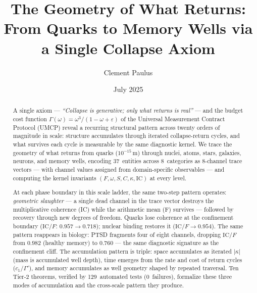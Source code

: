 \documentclass[
  aps,
  prd,
  twocolumn,
  superscriptaddress,
  nofootinbib,
  floatfix
]{revtex4-2}
\newcommand{\Gam}{\Gamma}
\newcommand{\eps}{\varepsilon}
\newcommand{\IC}{\mathrm{IC}}
\begin{document}
\title{The Geometry of What Returns:\texorpdfstring{\\}{: }
From Quarks to Memory Wells via a Single Collapse Axiom}

\author{Clement Paulus}

\date{July 2025}

\begin{abstract}
A single axiom --- \emph{``Collapse is generative; only what
returns is real''} --- and the budget cost function
$\Gam(\omega) = \omega^3/(1 - \omega + \eps)$ of the Universal
Measurement Contract Protocol (UMCP) reveal a recurring
structural pattern across twenty orders of magnitude in scale:
structure accumulates through iterated collapse-return cycles,
and what survives each cycle is measurable by the same
diagnostic kernel.  We trace the geometry of what returns
from quarks ($10^{-15}$\,m) through nuclei, atoms, stars,
galaxies, neurons, and memory wells, encoding 37~entities
across 8~categories as 8-channel trace vectors --- with
channel values assigned from domain-specific observables ---
and computing the kernel invariants
$(F, \omega, S, C, \kappa, \IC)$ at every level.

At each phase boundary in this
scale ladder, the same two-step pattern operates:
\emph{geometric slaughter} --- a single dead channel in the
trace vector destroys the multiplicative coherence (IC) while
the arithmetic mean (F) survives --- followed by recovery
through new degrees of freedom.  Quarks lose coherence at the
confinement boundary ($\IC/F$: $0.957 \to 0.718$); nuclear
binding restores it ($\IC/F \to 0.954$).  The same pattern
reappears in biology: PTSD fragments four of eight channels,
dropping $\IC/F$ from $0.982$ (healthy memory) to $0.760$ ---
the same diagnostic signature as the confinement cliff.  The
accumulation pattern is triple: space accumulates as iterated
$|\kappa|$ (mass is accumulated well depth), time emerges from
the rate and cost of return cycles ($c_1 / \Gam'$), and memory
accumulates as well geometry shaped by repeated traversal.
Ten Tier-2 theorems, verified by 129~automated tests
(0~failures), formalize these three modes of accumulation and
the cross-scale pattern they produce.
\end{abstract}

\end{document}
